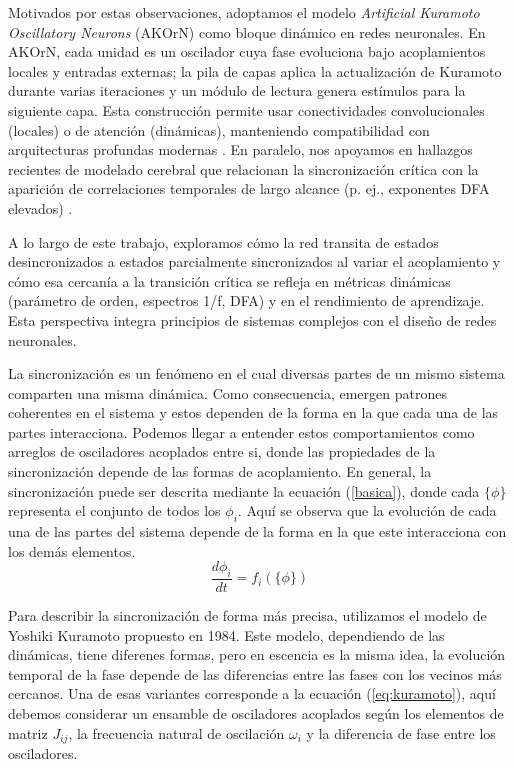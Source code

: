 \documentclass[12pt]{article}
\begin{document}
Motivados por estas observaciones, adoptamos el modelo \textit{Artificial Kuramoto Oscillatory Neurons} (AKOrN) como bloque dinámico en redes neuronales. En AKOrN, cada unidad es un oscilador cuya fase evoluciona bajo acoplamientos locales y entradas externas; la pila de capas aplica la actualización de Kuramoto durante varias iteraciones y un módulo de lectura genera estímulos para la siguiente capa. Esta construcción permite usar conectividades convolucionales (locales) o de atención (dinámicas), manteniendo compatibilidad con arquitecturas profundas modernas \cite{Miyato2024}. En paralelo, nos apoyamos en hallazgos recientes de modelado cerebral que relacionan la sincronización crítica con la aparición de correlaciones temporales de largo alcance (p. ej., exponentes DFA elevados) \cite{Myrov2024}. 

A lo largo de este trabajo, exploramos cómo la red transita de estados desincronizados a estados parcialmente sincronizados al variar el acoplamiento y cómo esa cercanía a la transición crítica se refleja en métricas dinámicas (parámetro de orden, espectros 1/f, DFA) y en el rendimiento de aprendizaje. Esta perspectiva integra principios de sistemas complejos con el diseño de redes neuronales.

La sincronización es un fenómeno en el cual diversas partes de un mismo sistema comparten una misma dinámica. Como consecuencia, emergen patrones coherentes en el sistema y estos dependen de la forma en la que cada una de las partes interacciona. Podemos llegar a entender estos comportamientos como  arreglos de osciladores acoplados entre si, donde las propiedades de la sincronización depende de las formas de acoplamiento. En general, la sincronización puede ser descrita mediante la ecuación (\ref{basica}), donde cada $\{\phi\}$ representa el conjunto de todos los $\phi_{i}$. Aquí se observa que la evolución de cada una de las partes del sistema depende de la forma en la que este interacciona con los demás elementos. 
\begin{equation}
    \frac{d\phi_{i}}{dt}= f_{i}(\{\phi\})
    \label{basica}
\end{equation}


Para describir la sincronización de forma más precisa, utilizamos el modelo de  Yoshiki Kuramoto propuesto en 1984\cite{Kuramoto1984}. Este modelo, dependiendo de las dinámicas, tiene diferenes formas, pero en escencia es la misma idea, la evolución temporal de la fase depende de las diferencias entre las fases con los vecinos más cercanos. Una de esas variantes corresponde a la ecuación (\ref{eq:kuramoto}), aquí debemos considerar un ensamble de osciladores acoplados según  los elementos de matriz $J_{ij}$, la frecuencia natural de oscilación $\omega_{i}$ y la diferencia de fase entre los osciladores. 
\end{document}
